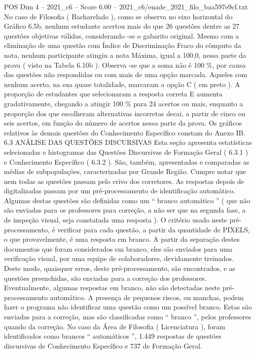 \begin{textsample}{POS Dim 4 – 2021\_c6 – Score 6.00 – 2021\_c6/enade\_2021\_filo\_baa597e9cf.txt}
No caso de Filosofia ( Bacharelado ), como se observa no eixo horizontal do Gráfico 6.5b, nenhum estudante acertou mais do que 26 questões dentre as 27 questões objetivas válidas, considerando -se o gabarito original.
Mesmo com a eliminação de uma questão com Índice de Discriminação Fraco do cômputo da nota, nenhum participante atingiu a nota Máxima, igual a 100,0, nessa parte da prova ( visto na Tabela 6.10b ).
Observa -se que a soma não é 100 \%, por causa das questões não respondidas ou com mais de uma opção marcada.
Aqueles com nenhum acerto, na sua quase totalidade, marcaram a opção C ( em preto ).
A proporção de estudantes que selecionaram a resposta correta E aumenta gradativamente, chegando a atingir 100 \% para 24 acertos ou mais, enquanto a proporção dos que escolheram alternativas incorretas decai, a partir de cinco ou seis acertos, em função do número de acertos nessa parte da prova.
Os gráficos relativos às demais questões do Conhecimento Específico constam do Anexo IB. 6.3 ANÁLISE DAS QUESTÕES DISCURSIVAS Esta seção apresenta estatísticas selecionadas e histogramas das Questões Discursivas de Formação Geral ( 6.3.1 ) e Conhecimento Específico ( 6.3.2 ).
São, também, apresentadas e comparadas as médias de subpopulações, caracterizadas por Grande Região.
Cumpre notar que nem todas as questões passam pelo crivo dos corretores.
As respostas depois de digitalizadas passam por um pré-processamento de identificação automático.
Algumas destas questões são definidas como um “ branco automático ” ( que não são enviadas para os professores para correção, a não ser que na segunda fase, a de inspeção visual, seja constatada uma resposta ).
O critério usado neste pré-processamento, é verificar para cada questão, a partir da quantidade de PIXELS, o que provavelmente, é uma resposta em branco.
A partir da separação destes documentos que foram considerados em branco, eles são enviados para uma verificação visual, por uma equipe de colaboradores, devidamente treinados.
Deste modo, quaisquer erros, deste pré-processamento, são encontrados, e as questões preenchidas, são enviadas para a correção dos professores.
Eventualmente, algumas respostas em branco, não são detectadas neste pré-processamento automático.
A presença de pequenos riscos, ou manchas, podem fazer o programa não identificar uma questão como um possível branco.
Estas são enviadas para a correção, mas são classificadas como “ branco ”, pelos professores quando da correção.
No caso da Área de Filosofia ( Licenciatura ), foram identificados como brancos “ automáticos ”, 1.449 respostas de questões discursivas de Conhecimento Específico e 737 de Formação Geral.

\end{textsample}
